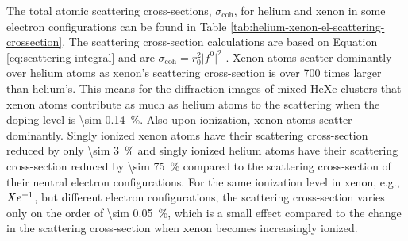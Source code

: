 %
The total atomic scattering cross-sections, $\sigma_{\text{coh}}$, for helium and xenon in some electron configurations can be found in Table \ref{tab:helium-xenon-el-scattering-crossection}. The scattering cross-section calculations are based on Equation \eqref{eq:scattering-integral} and are $\sigma_{\text{coh}}=r_{0}^{2}\lvert f^{0}\rvert^{2}$ \citep{Ho-2016-PC}. Xenon atoms scatter dominantly over helium atoms as xenon's scattering cross-section is over \num{700} times larger than helium's. This means for the diffraction images of mixed HeXe-clusters that xenon atoms contribute as much as helium atoms to the scattering when the doping level is \SI{\sim 0.14}{\percent}. Also upon ionization, xenon atoms scatter dominantly. Singly ionized xenon atoms have their scattering cross-section reduced by only \SI{\sim 3}{\percent} and singly ionized helium atoms have their scattering cross-section reduced by \SI{\sim 75}{\percent} compared to the scattering cross-section of their neutral electron configurations. For the same ionization level in xenon, e.g., $Xe\textsuperscript{+1}$, but different electron configurations, the scattering cross-section varies only on the order of \SI{\sim 0.05}{\percent}, which is a small effect compared to the change in the scattering cross-section when xenon becomes increasingly ionized.
%
%
%
